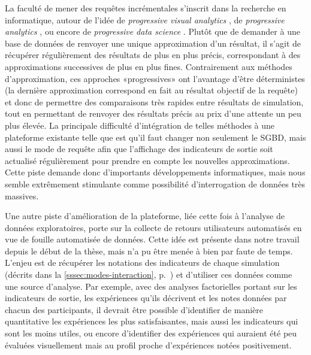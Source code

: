 La faculté de mener des requêtes incrémentales s'inscrit dans la recherche en informatique, autour de l'idée de \og \textit{progressive visual analytics}\fg{} \autocite{6876049}, de \og \textit{progressive analytics}\fg{} \autocite{fekete_progressive_2016}, ou encore de \og \textit{progressive data science}\fg{} \autocite{turkay_progressive_2018}. Plutôt que de demander à une base de données de renvoyer une unique approximation d'un résultat, il s'agit de récupérer régulièrement des résultats de plus en plus précis, correspondant à des approximations successives de plus en plus fines. Contrairement aux méthodes d'approximation, ces approches «progressives» ont l'avantage d'être déterministes (la dernière approximation correspond en fait au résultat \og objectif\fg{} de la requête) et donc de permettre des comparaisons très rapides entre résultats de simulation, tout en permettant de renvoyer des résultats précis au prix d'une attente un peu plus élevée. La principale difficulté d'intégration de telles méthodes à une plateforme existante telle que \simedb{} est qu'il faut changer non seulement le SGBD, mais aussi le mode de requête afin que l'affichage des indicateurs de sortie soit actualisé régulièrement pour prendre en compte les nouvelles approximations. Cette piste demande donc d'importants développements informatiques, mais nous semble extrêmement stimulante comme possibilité d'interrogation de données très massives.

Une autre piste d'amélioration de la plateforme, liée cette fois à l'analyse de données exploratoires, porte sur la collecte de retours utilisateurs automatisés en vue de fouille automatisée de données. Cette idée est présente dans notre travail depuis le début de la thèse, mais n'a pu être menée à bien par faute de temps. L'enjeu est de récupérer les \og notations\fg{} des indicateurs de chaque simulation (décrits dans la \cref{sssec:modes-interaction}, p.~\pageref{par:noter-simul}) et d'utiliser ces données comme une source d'analyse. Par exemple, avec des analyses factorielles portant sur les indicateurs de sortie, les expériences qu'ils décrivent et les notes données par chacun des participants, il devrait être possible d'identifier de manière quantitative les expériences les plus satisfaisantes, mais aussi les indicateurs qui sont les moins utiles, ou encore d'identifier des expériences qui auraient été peu évaluées visuellement mais au profil proche d'expériences notées positivement.

